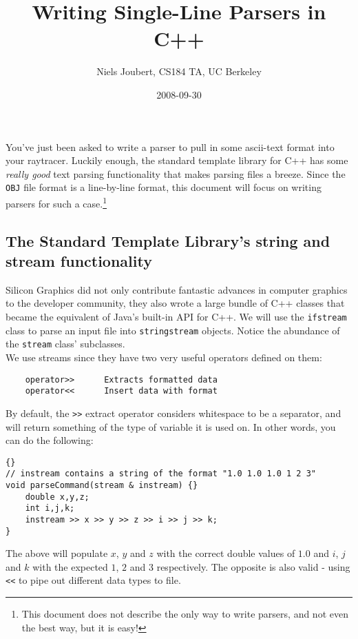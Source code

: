\documentclass[]{article}
\title{Writing Single-Line Parsers in C++}
\author{ Niels Joubert, CS184 TA, UC Berkeley }
\date{2008-09-30}
\begin{document}
\ifpdf
{}
\else
{}
\fi

\maketitle

You've just been asked to write a parser to pull in some ascii-text format into your raytracer. Luckily enough, the standard template library for C++ has some {\it really good} text parsing functionality that makes parsing files a breeze. Since the \verb=OBJ= file format is a line-by-line format, this document will focus on writing parsers for such a case.\footnote{This document does not describe the only way to write parsers, and not even the best way, but it is easy!}

\subsection{The Standard Template Library's string and stream functionality}\label{stl}

Silicon Graphics did not only contribute fantastic advances in computer graphics to the developer community, they also wrote a large bundle of C++ classes that became the equivalent of Java's built-in API for C++. We will use the \verb=ifstream= class to parse an input file into \verb=stringstream= objects. Notice the abundance of the \verb=stream= class' subclasses.
\\
We use streams since they have two very useful operators defined on them:
\begin{verbatim}
    operator>>      Extracts formatted data
    operator<<      Insert data with format
\end{verbatim}
By default, the \verb=>>= extract operator considers whitespace to be a separator, and will return something of the type of variable it is used on. In other words, you can do the following:

\lstset{language=c++}
\lstset{commentstyle=\textit}
\begin{lstlisting}[frame=trbl]{}
// instream contains a string of the format "1.0 1.0 1.0 1 2 3"
void parseCommand(stream & instream) {}    
    double x,y,z;
    int i,j,k;
    instream >> x >> y >> z >> i >> j >> k;
}
\end{lstlisting}

The above will populate $x$, $y$ and $z$ with the correct double values of $1.0$ and $i$, $j$ and $k$ with the expected $1$, $2$ and $3$ respectively. The opposite is also valid - using \verb=<<= to pipe out different data types to file.
\end{document}
